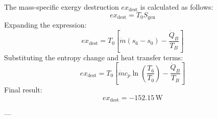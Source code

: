 The mass-specific exergy destruction \( ex_{\text{dest}} \) is calculated as follows:  
\[
ex_{\text{dest}} = T_0 S_{\text{gen}}
\]  
Expanding the expression:  
\[
ex_{\text{dest}} = T_0 \left[ \dot{m} (s_6 - s_0) - \frac{\dot{Q}_B}{T_B} \right]
\]  
Substituting the entropy change and heat transfer terms:  
\[
ex_{\text{dest}} = T_0 \left[ \dot{m} c_p \ln \left( \frac{T_6}{T_0} \right) - \frac{\dot{Q}_B}{T_B} \right]
\]  
Final result:  
\[
ex_{\text{dest}} = -152.15 \, \text{W}
\]  

---